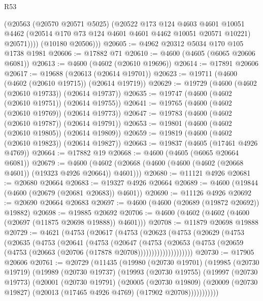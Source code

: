 \begin{lexlean}{R53}
\begin{coremodule}
            (@20563
              (@20570 @20571 @5025)
              (@20522
                @173
                @124
                @4603
                @4601
                @10051
                @4462
                (@20514 @170 @73 @124 @4601 @4601 @4462 @10051 @20571 @10221)
                @20571))))
        (@10180 @20506)))
@20605 := @4962 @20312 @5034 @170 @105 @1738 @1981
@20606 := @17882 @71
@20610 := @4600 (@4605 (@6065 @20606 @6081))
@20613 := @4600 (@4602 (@20610 @19696))
@20614 := @17891 @20606
@20617 := @19688 (@20613 (@20614 @19701))
@20623 := @19711 (@4600 (@4602 (@20610 @19715)) (@20614 @19719))
@20629 := @19729 (@4600 (@4602 (@20610 @19733)) (@20614 @19737))
@20635 := @19747 (@4600 (@4602 (@20610 @19751)) (@20614 @19755))
@20641 := @19765 (@4600 (@4602 (@20610 @19769)) (@20614 @19773))
@20647 := @19783 (@4600 (@4602 (@20610 @19787)) (@20614 @19791))
@20653 := @19801 (@4600 (@4602 (@20610 @19805)) (@20614 @19809))
@20659 := @19819 (@4600 (@4602 (@20610 @19823)) (@20614 @19827))
@20663 := @19837 (@4605 (@17461 @4926 @4769))
@20664 := @17882 @19
@20668 := @4600 (@4605 (@6065 @20664 @6081))
@20679 := @4600 (@4602 (@20668 (@4600 (@4600 (@4602 (@20668 @4601)) (@19323 @4926 @20664)) @4601)))
@20680 := @11121 @4926
@20681 := @20680 @20664
@20683 := @19327 @4926 @20664
@20689 := @4600 (@19844 (@4600 (@20679 (@20681 @20683)) @4601))
@20690 := @11126 @4926
@20692 := @20690 @20664 @20683
@20697 := @4600 (@4600 (@20689 (@19872 @20692)) @19882)
@20698 := @19885 @20692
@20706 := @4600 (@4602 (@4602 (@4600 (@20697 (@11875 @20698 @19888)) @4601)))
@20708 := @11879 @20698 @19888
@20729 := @4621
    (@4753
      (@20617
        (@4753
          (@20623
            (@4753
              (@20629
                (@4753
                  (@20635
                    (@4753
                      (@20641
                        (@4753
                          (@20647
                            (@4753
                              (@20653
                                (@4753
                                  (@20659 (@4753 (@20663 (@20706 (@17878 @20708))))))))))))))))))))
@20730 := @17905 @20606
@20761 := @20729
    (@11435
      (@19980
        (@20730 @19701)
        (@19985
          (@20730 @19719)
          (@19989
            (@20730 @19737)
            (@19993
              (@20730 @19755)
              (@19997
                (@20730 @19773)
                (@20001
                  (@20730 @19791)
                  (@20005
                    (@20730 @19809)
                    (@20009 (@20730 @19827) (@20013 (@17465 @4926 @4769) (@17902 @20708)))))))))))

\end{coremodule}
\end{lexlean}
